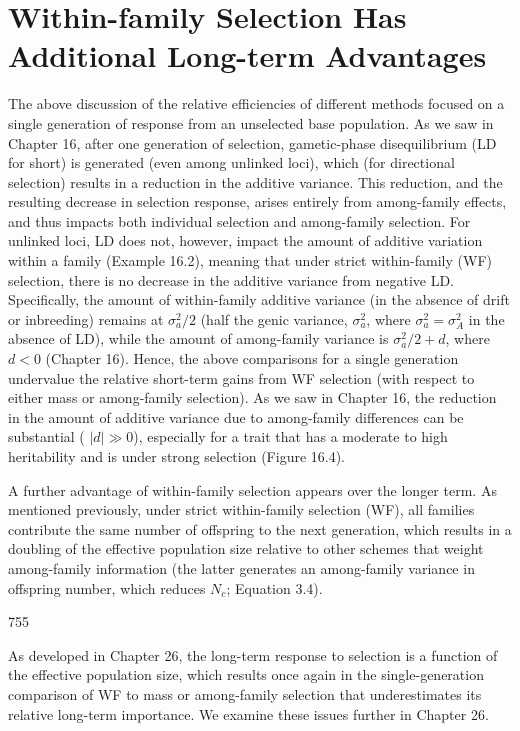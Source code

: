 \documentclass{article}
\begin{document}
\section{Within-family Selection Has Additional Long-term Advantages}
The above discussion of the relative efficiencies of different methods focused on a single generation of response from an unselected base population. As we saw in Chapter 16, after one generation of selection, gametic-phase disequilibrium (LD for short) is generated (even among unlinked loci), which (for directional selection) results in a reduction in the additive variance. This reduction, and the resulting decrease in selection response, arises entirely from among-family effects, and thus impacts both individual selection and among-family selection. For unlinked loci, LD does not, however, impact the amount of additive variation within a family (Example 16.2), meaning that under strict within-family (WF) selection, there is no decrease in the additive variance from negative LD. Specifically, the amount of within-family additive variance (in the absence of drift or inbreeding) remains at  $ \sigma_a^2 / 2 $ (half the genic variance,  $ \sigma_a^2 $, where  $ \sigma_a^2 = \sigma_A^2 $ in the absence of LD), while the amount of among-family variance is  $ \sigma_a^2 / 2 + d $, where  $ d < 0 $ (Chapter 16). Hence, the above comparisons for a single generation undervalue the relative short-term gains from WF selection (with respect to either mass or among-family selection). As we saw in Chapter 16, the reduction in the amount of additive variance due to among-family differences can be substantial ( $ |d| \gg 0 $), especially for a trait that has a moderate to high heritability and is under strong selection (Figure 16.4).

A further advantage of within-family selection appears over the longer term. As mentioned previously, under strict within-family selection (WF), all families contribute the same number of offspring to the next generation, which results in a doubling of the effective population size relative to other schemes that weight among-family information (the latter generates an among-family variance in offspring number, which reduces  $ N_{c} $; Equation 3.4).

755

As developed in Chapter 26, the long-term response to selection is a function of the effective population size, which results once again in the single-generation comparison of WF to mass or among-family selection that underestimates its relative long-term importance. We examine these issues further in Chapter 26.
\end{document}
